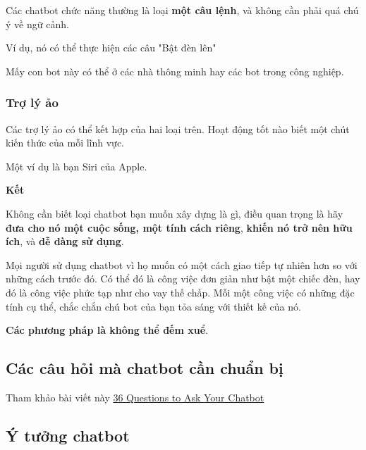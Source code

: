 Các chatbot chức năng thường là loại \textbf{một câu lệnh}, và không cần phải quá chú ý về ngữ cảnh.

Ví dụ, nó có thể thực hiện các câu "Bật đèn lên"

Mấy con bot này có thể ở các nhà thông minh hay các bot trong công nghiệp.

\subsubsection{Trợ lý ảo}

Các trợ lý ảo có thể kết hợp của hai loại trên. Hoạt động tốt nào biết một chút kiến thức của mỗi lĩnh vực.

Một ví dụ là bạn Siri của Apple.

\textbf{Kết}

Không cần biết loại chatbot bạn muốn xây dựng là gì, điều quan trọng là hãy \textbf{đưa cho nó một cuộc sống, một tính cách riêng}, \textbf{khiến nó trở nên hữu ích}, và \textbf{dễ dàng sử dụng}.

Mọi người sử dụng chatbot vì họ muốn có một cách giao tiếp tự nhiên hơn so với những cách trước đó. Có thể đó là công việc đơn giản như bật một chiếc đèn, hay đó là công việc phức tạp như cho vay thế chấp. Mỗi một công việc có những đặc tính cụ thể, chắc chắn chú bot của bạn tỏa sáng với thiết kế của nó.

\textbf{Các phương pháp là không thể đếm xuể}.

\subsection{Các câu hỏi mà chatbot cần chuẩn bị}

Tham khảo bài viết này \href{https://journalofbeautifulbusiness.com/36-questions-to-ask-your-chatbot-5287b9908885}{36 Questions to Ask Your Chatbot}


\subsection{Ý tưởng chatbot}


